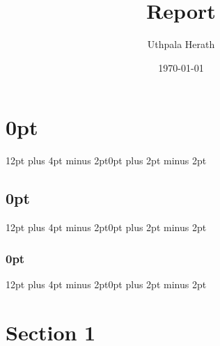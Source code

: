\documentclass[
reprint,
amsmath,amssymb, aps,
prb, showkeys, dvipsnames,
onecolumn]{revtex4-2}
\begin{document}


\titlespacing\section{0pt}{12pt plus 4pt minus 2pt}{0pt plus 2pt minus 2pt}
\titlespacing\subsection{0pt}{12pt plus 4pt minus 2pt}{0pt plus 2pt minus 2pt}
\titlespacing\subsubsection{0pt}{12pt plus 4pt minus 2pt}{0pt plus 2pt minus 2pt}

\setlength{\parindent}{0pt}
\setlength{\parskip}{0.5em}  %

\title{Report}

\author{Uthpala Herath}

\date{\today}

\maketitle

\vspace{-0.5cm}
\section{Section 1}




\end{document}
